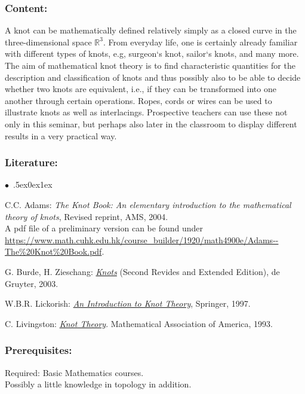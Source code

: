 \documentclass[a4paper,10pt]{article}
\renewenvironment{itemize}{\begin{list}{$\bullet$\ }{\itemsep.5ex\setlength{\topsep}{0.5\itemsep}\parsep0ex\labelsep1ex\settowidth{\labelwidth}{$\bullet$\ }\setlength{\leftmargin}{\labelwidth}\addtolength{\leftmargin}{3ex}\addtolength{\leftmargin}{\labelsep}}}{\end{list}}
\begin{document}
\subsubsection*{\large
    Content:
}
A knot can be mathematically defined relatively simply as a closed curve in the three-dimensional space $\mathbb{R}^3$. From everyday life, one is certainly already familiar with different types of knots, e.g, surgeon`s knot, sailor`s knots, and many more. The aim of mathematical knot theory is to find characteristic quantities for the description and classification of knots and thus possibly also to be able to decide whether two knots are equivalent,  i.e., if they can be transformed into one another through certain operations.
Ropes, cords or wires can be used to illustrate knots as well as interlacings. Prospective teachers can use these not only in this seminar, but perhaps also later in the classroom to display different results in a very practical way.
\subsubsection*{\large
    Literature:
}
\begin{itemize} 
\item C.C. Adams: \textit{The Knot Book: An elementary introduction to the mathematical theory of knots}, Revised reprint, AMS, 2004.\\
A pdf file of a preliminary version can be found under \url{https://www.math.cuhk.edu.hk/course\_builder/1920/math4900e/Adams--The\%20Knot\%20Book.pdf}.            
\item G. Burde, H. Zieschang: \href{https://www.maths.ed.ac.uk/~v1ranick/papers/burdzies.pdf}{\textit{Knots}} (Second Revides and Extended Edition), de Gruyter, 2003.
\item W.B.R. Lickorish: \href{http://www.redi-bw.de/start/unifr/EBooks-springer/10.1007/978-1-4612-0691-0}{\textit{An Introduction to Knot Theory}}, Springer, 1997.
\item C. Livingston: \href{https://www.math.cuhk.edu.hk/course\_builder/1920/math4900e/Livingston\%20C.---Knot\%20theory\%20(MAA,\%201996).pdf}{\textit{Knot Theory}}. Mathematical Association of America, 1993.
\end{itemize}
\subsubsection*{\large
    Prerequisites:
}
Required: Basic Mathematics courses. \\ Possibly a little  knowledge in topology in addition.
\end{document}
